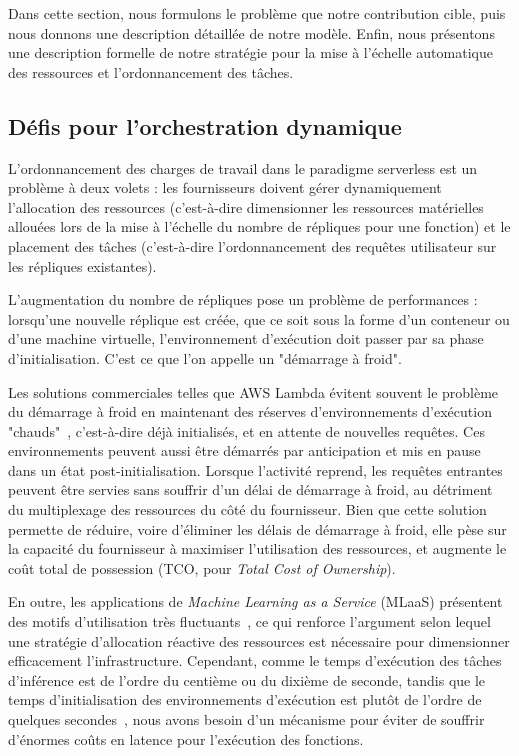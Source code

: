 Dans cette section, nous formulons le problème que notre contribution cible, puis nous donnons une description détaillée de notre modèle. Enfin, nous présentons une description formelle de notre stratégie pour la mise à l'échelle automatique des ressources et l'ordonnancement des tâches.

\subsection{Défis pour l'orchestration dynamique}

L'ordonnancement des charges de travail dans le paradigme serverless est un problème à deux volets : les fournisseurs doivent gérer dynamiquement l'allocation des ressources (c'est-à-dire dimensionner les ressources matérielles allouées lors de la mise à l'échelle du nombre de répliques pour une fonction) et le placement des tâches (c'est-à-dire l'ordonnancement des requêtes utilisateur sur les répliques existantes).

L'augmentation du nombre de répliques pose un problème de performances : lorsqu'une nouvelle réplique est créée, que ce soit sous la forme d'un conteneur ou d'une machine virtuelle, l'environnement d'exécution doit passer par sa phase d'initialisation. C'est ce que l'on appelle un "démarrage à froid".

Les solutions commerciales telles que \gls{AWS} Lambda évitent souvent le problème du démarrage à froid en maintenant des réserves d'environnements d'exécution "chauds"~\cite{vahidiniaColdStartServerless2020}, c'est-à-dire déjà initialisés, et en attente de nouvelles requêtes. Ces environnements peuvent aussi être démarrés par anticipation et mis en pause dans un état post-initialisation. Lorsque l'activité reprend, les requêtes entrantes peuvent être servies sans souffrir d'un délai de démarrage à froid, au détriment du multiplexage des ressources du côté du fournisseur. Bien que cette solution permette de réduire, voire d'éliminer les délais de démarrage à froid, elle pèse sur la capacité du fournisseur à maximiser l'utilisation des ressources, et augmente le coût total de possession (\gls{TCO}, pour \textit{Total Cost of Ownership}).

En outre, les applications de \textit{Machine Learning as a Service} (\gls{MLaaS}) présentent des motifs d'utilisation très fluctuants~\cite{gujaratiSwayamDistributedAutoscaling2017}, ce qui renforce l'argument selon lequel une stratégie d'allocation réactive des ressources est nécessaire pour dimensionner efficacement l'infrastructure. Cependant, comme le temps d'exécution des tâches d'inférence est de l'ordre du centième ou du dixième de seconde, tandis que le temps d'initialisation des environnements d'exécution est plutôt de l'ordre de quelques secondes~\cite{mancoMyVMLighter2017}, nous avons besoin d'un mécanisme pour éviter de souffrir d'énormes coûts en latence pour l'exécution des fonctions.

